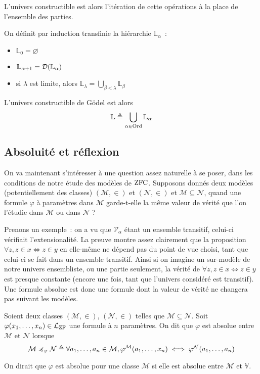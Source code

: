 L'univers constructible est alors l'itération de cette opérations à la place de
l'ensemble des parties.

\begin{definition}\label{def.L}
  On définit par induction transfinie la hiérarchie $\mathbb L_\alpha$~:
  \begin{itemize}
  \item $\mathbb L_0 = \varnothing$
  \item $\mathbb L_{\alpha + 1} = \mathcal{D} (\mathbb L_\alpha)$
  \item si $\lambda$ est limite, alors
    $\displaystyle\mathbb L_\lambda = \bigcup_{\beta < \lambda} \mathbb L_\beta$
  \end{itemize}
  L'univers constructible de Gödel est alors
  \[\mathbb L \triangleq \bigcup_{\alpha \in \operatorname{Ord}} \mathbb L_\alpha\]
\end{definition}

\subsection{Absoluité et réflexion}

On va maintenant s'intéresser à une question assez naturelle à se poser, dans
les conditions de notre étude des modèles de $\operatorname{ZFC}$. Supposons donnés deux
modèles (potentiellement des classes) $(\mathcal M,\in)$ et $(\mathcal N,\in)$
et $\mathcal M \subseteq \mathcal N$, quand une formule $\varphi$ à paramètres
dans $\mathcal M$ garde-t-elle la même valeur de vérité que l'on l'étudie dans
$\mathcal M$ ou dans $\mathcal N$ ?

Prenons un exemple~: on a vu que $\mathcal V_\alpha$ étant un ensemble
transitif, celui-ci vérifiait l'extensionalité. La preuve montre assez
clairement que la proposition $\forall z, z \in x \iff z \in y$ en elle-même
ne dépend pas du point de vue choisi, tant que celui-ci se fait dans un
ensemble transitif. Ainsi si on imagine un sur-modèle de notre univers
ensembliste, ou une partie seulement, la vérité de
$\forall z, z \in x \iff z \in y$ est presque constante (encore une fois, tant
que l'univers considéré est transitif). Une formule absolue est donc une
formule dont la valeur de vérité ne changera pas suivant les modèles.

\begin{definition}
  Soient deux classes $(\mathcal M,\in)$, $(\mathcal N,\in)$ telles que
  $\mathcal M \subseteq \mathcal N$.
  Soit $\varphi(x_1,\ldots,x_n) \in \mathcal L_{\operatorname{ZF}}$ une formule à $n$
  paramètres. On dit que $\varphi$ est absolue entre $\mathcal M$ et
  $\mathcal N$ lorsque
  \[\mathcal M \preccurlyeq_\varphi \mathcal N \triangleq
  \forall a_1,\ldots,a_n \in \mathcal M, \varphi^{\mathcal M}(a_1,\ldots,x_n)
  \iff \varphi^{\mathcal N}(a_1,\ldots,a_n)\]

  On dirait que $\varphi$ est absolue pour une classe $\mathcal M$ si elle est
  absolue entre $\mathcal M$ et $\mathbb V$.
\end{definition}

